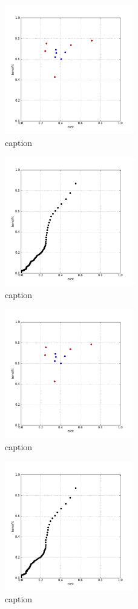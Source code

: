 %
\begin{figure}[!ht]
	\centering
	\includegraphics[width=0.5\textwidth]{img/p1figs/computeFrameStateMagnitudeOnly_simpleCompare_smooth0_tol0.png}
	\caption{caption}
\end{figure}
%
\begin{figure}[!ht]
	\centering
	\includegraphics[width=0.5\textwidth]{img/p1figs/computeFrameStateMagnitudeOnly_simpleCompare_smooth0_tol0_AUC.png}
	\caption{caption}
\end{figure}
%
\begin{figure}[!ht]
	\centering
	\includegraphics[width=0.5\textwidth]{img/p1figs/computeFrameStateMagnitudeOnly_simpleCompare_smooth12_tol0.png}
	\caption{caption}
\end{figure}
%
\begin{figure}[!ht]
	\centering
	\includegraphics[width=0.5\textwidth]{img/p1figs/computeFrameStateMagnitudeOnly_simpleCompare_smooth12_tol0_AUC.png}
	\caption{caption}
\end{figure}
%
